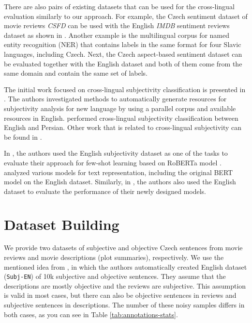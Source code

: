 \documentclass[10pt, a4paper]{article}
\begin{document}
\par There are also pairs of existing datasets that can be used for the cross-lingual evaluation similarly to our approach. For example, the Czech sentiment dataset of movie reviews \textit{CSFD} \cite{habernal-etal-2013-sentiment} can be used with the English \textit{IMDB} \cite{maas-etal-2011-learning-imdb} sentiment reviews dataset as shown in \cite{priban-steinberger-2021-multilingual}. Another example is the multilingual corpus \cite{piskorski-etal-2019-second} for named entity recognition (NER) that contains labels in the same format for four Slavic languages, including Czech. Next, the Czech aspect-based sentiment dataset \cite{hercig2016unsupervised-absa} can be evaluated together with the English dataset \cite{pontiki-etal-2014-semeval} and both of them come from the same domain and contain the same set of labels.

\par The initial work focused on cross-lingual subjectivity classification is presented in \cite{mihalcea-etal-2007-learning}. The authors investigated methods to automatically generate resources for subjectivity analysis for new language by using a parallel corpus and available resources in English.  performed cross-lingual subjectivity classification between English and Persian. Other work that is related to cross-lingual subjectivity can be found in \cite{saralegi2013cross}.


\par In \cite{wang2021entailment-few-shot-learner}, the authors used the English subjectivity dataset as one of the tasks to evaluate their approach for few-shot learning based on RoBERTa model \cite{liu2019roberta}. \cite{nandi2021empirical-indove-subj} analyzed various models for text representation, including the original BERT model \cite{devlin-etal-2019-bert} on the English dataset. Similarly, in \cite{zhao2015self-adasent,CNN-MCFA-subj-2018,khodak-etal-2018-la-byte-mLSTM7,reimers-gurevych-2019-sentence}, the authors also used the English dataset to evaluate the performance of their newly designed models.


\section{Dataset Building}
We provide two datasets
of subjective and objective Czech sentences from movie reviews and movie descriptions (plot summaries), respectively. We use the mentioned idea from , in which the authors automatically created English dataset (\texttt{Subj-EN}) of 10k subjective and objective sentences. They assume that the descriptions are mostly objective and the reviews are subjective. This assumption is valid in most cases, but there can also be objective sentences in reviews and subjective sentences in descriptions. The number of these noisy samples differs in both cases, as you can see in Table \ref{tab:annotations-stats}.
\end{document}
